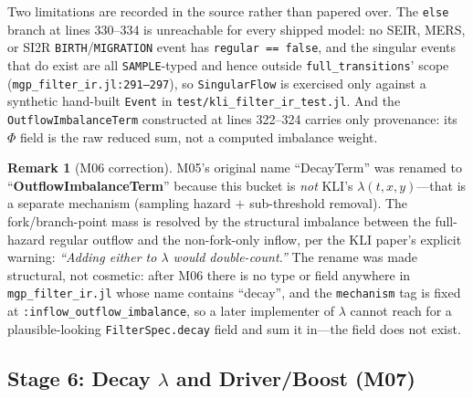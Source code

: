 \documentclass[11pt,leqno]{article}
\newcommand{\code}[1]{\texttt{#1}}
\theoremstyle{plain}
\theoremstyle{definition}
\newtheorem{remark}[theorem]{Remark}
\begin{document}
Two limitations are recorded in the source rather than papered over.  The
\code{else} branch at lines 330--334 is unreachable for every shipped model:
no SEIR, MERS, or SI2R \code{BIRTH}/\code{MIGRATION} event has
\code{regular == false}, and the singular events that do exist are all
\code{SAMPLE}-typed and hence outside \code{full\_transitions}' scope
(\code{mgp\_filter\_ir.jl:291--297}), so \code{SingularFlow} is exercised only
against a synthetic hand-built \code{Event} in
\code{test/kli\_filter\_ir\_test.jl}.  And the \code{OutflowImbalanceTerm}
constructed at lines 322--324 carries only provenance: its $\Phi$ field is the
raw reduced sum, not a computed imbalance weight.

\begin{remark}[M06 correction]
M05's original name ``DecayTerm'' was renamed to
``\textbf{OutflowImbalanceTerm}'' because this bucket is \emph{not}
KLI's $\lambda(t,x,y)$---that is a separate mechanism (sampling hazard
$+$ sub-threshold removal).  The fork/branch-point mass is resolved by
the structural imbalance between the full-hazard regular outflow and
the non-fork-only inflow, per the KLI paper's explicit warning:
\emph{``Adding either to $\lambda$ would double-count.''}
The rename was made structural, not cosmetic: after M06 there is no type or
field anywhere in \code{mgp\_filter\_ir.jl} whose name contains ``decay'', and
the \code{mechanism} tag is fixed at \code{:inflow\_outflow\_imbalance}, so a
later implementer of $\lambda$ cannot reach for a plausible-looking
\code{FilterSpec.decay} field and sum it in---the field does not exist.
\end{remark}

\subsection{Stage 6: Decay $\lambda$ and Driver/Boost (M07)}
\end{document}
